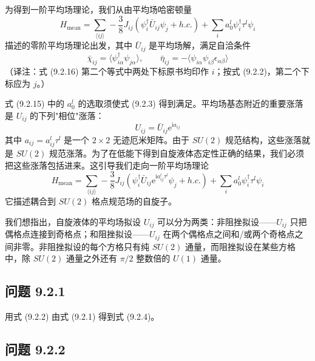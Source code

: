 为得到一阶平均场理论，我们从由平均场哈密顿量
\begin{equation*}
H_{\text{mean}}=\sum_{\langle ij\rangle}-\frac{3}{8}J_{ij}(\psi^{\dagger}_i\bar{U}_{ij}\psi_j+h.c.)+\sum_i a^l_0\psi^{\dagger}_i\tau^l\psi_i
\tag{9.2.15}
\end{equation*}
描述的零阶平均场理论出发，其中 $\bar{U}_{ij}$ 是平均场解，满足自洽条件
\begin{equation*}
\bar{\chi}_{ij}=\langle\psi^{\dagger}_{i\alpha}\psi_{j\alpha}\rangle,\qquad \bar{\eta}_{ij}=-\langle\psi_{i\alpha}\psi_{i\beta}\epsilon_{\alpha\beta}\rangle
\tag{9.2.16}
\end{equation*}
（译注：式 (9.2.16) 第二个等式中两处下标原书均印作 $i$；按式 (9.2.2)，第二个下标应为 $j$。）

式 (9.2.15) 中的 $a^l_0$ 的选取须使式 (9.2.3) 得到满足。平均场基态附近的重要涨落是 $U_{ij}$ 的下列"相位"涨落：
\begin{equation*}
U_{ij}=\bar{U}_{ij}\mathrm{e}^{\mathrm{i}a_{ij}}
\tag{9.2.17}
\end{equation*}
其中 $a_{ij}=a^l_{ij}\tau^l$ 是一个 $2\times2$ 无迹厄米矩阵。由于 $SU(2)$ 规范结构，这些涨落就是 $SU(2)$ 规范涨落。为了在低能下得到自旋液体态定性正确的结果，我们必须把这些涨落包括进来。这引导我们走向一阶平均场理论
\begin{equation*}
H_{\text{mean}}=\sum_{\langle ij\rangle}-\frac{3}{8}J_{ij}(\psi^{\dagger}_i\bar{U}_{ij}\mathrm{e}^{\mathrm{i}a^l_{ij}\tau^l}\psi_j+h.c.)+\sum_i a^l_0\psi^{\dagger}_i\tau^l\psi_i
\tag{9.2.18}
\end{equation*}
它描述耦合到 $SU(2)$ 格点规范场的自旋子。

\begin{smallnote}
我们想指出，自旋液体的平均场拟设 $U_{ij}$ 可以分为两类：非阻挫拟设——$U_{ij}$ 只把偶格点连接到奇格点；和阻挫拟设——$U_{ij}$ 在两个偶格点之间和/或两个奇格点之间非零。非阻挫拟设的每个方格只有纯 $SU(2)$ 通量，而阻挫拟设在某些方格中，除 $SU(2)$ 通量之外还有 $\pi/2$ 整数倍的 $U(1)$ 通量。
\end{smallnote}

\subsection*{问题 9.2.1}

用式 (9.2.2) 由式 (9.2.1) 得到式 (9.2.4)。

\subsection*{问题 9.2.2}

